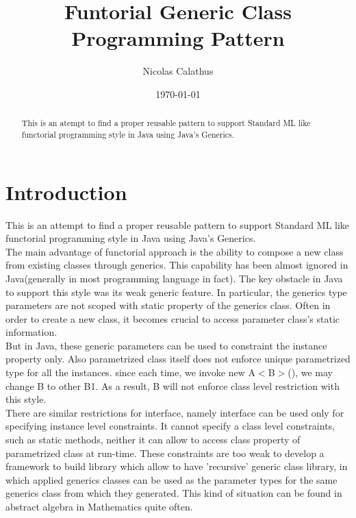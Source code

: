 \documentclass[8pt]{article}
\begin{document}
\title{Funtorial Generic Class Programming Pattern} %
\author{Nicolas Calathus} %
\date{\today}
\maketitle
\begin{abstract}
This is an atempt to find a proper reusable pattern to support Standard ML like functorial programming style in Java using Java's Generics.
\end{abstract}
\tableofcontents

\section{Introduction} %

This is an attempt to find a proper reusable pattern to support Standard ML like functorial programming style in Java using Java's Generics.\\
The main advantage of functorial approach is the ability to compose a new class from existing classes through generics.
This capability has been almost ignored in Java(generally in most programming language in fact).
The key obstacle in Java to support this style was its weak generic feature. In particular, the generics type parameters are not scoped with static property of the generics class.
Often in order to create a new class, it becomes crucial to access parameter class's static information.\\

But in Java, these generic parameters can be used to constraint the instance property only.
Also parametrized class itself does not enforce unique parametrized type for all the instances. since each time, we invoke new A$<$B$>$(), we may change B to other B1.
As a result, B will not enforce class level restriction with this style.\\

There are similar restrictions for interface, namely interface can be used only for specifying instance level constraints. 
It cannot specify a class level constraints, such as static methods, neither it can allow to access class property of parametrized class at run-time.
These constraints are too weak to develop a framework to build library which allow to have 'recursive' generic class library, in which applied generics classes can be used as the parameter types for the same generics class from which they generated.    
This kind of situation can be found in abstract algebra in Mathematics quite often.\\
\end{document}
